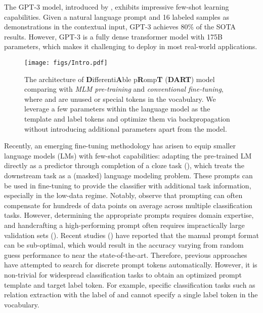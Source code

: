 \documentclass{article} \usepackage{iclr2022_conference,times}
\begin{document}
The GPT-3 model, introduced by \cite{DBLP:conf/nips/BrownMRSKDNSSAA20}, exhibits impressive few-shot learning capabilities. 
Given a natural language prompt and 16 labeled samples as demonstrations in the contextual input, GPT-3 achieves 80\% of the SOTA results.
However, GPT-3 is a fully dense transformer model with 175B parameters, which makes it challenging to deploy in most real-world applications. 






\begin{figure} 
\centering 
\texttt{[image: figs/Intro.pdf]}  
\caption{The architecture of \textbf{D}ifferenti\textbf{A}ble p\textbf{R}omp\textbf{T} (\textbf{DART}) model comparing with \emph{MLM pre-training} and \emph{conventional fine-tuning}, where  and  are unused or special tokens in the vocabulary.
 {\color{highlight}
We leverage a few parameters within the language model as the template and label tokens and optimize them via backpropagation without introducing additional parameters apart from the model. }
 } 
\label{model}  
\end{figure}


Recently, an emerging fine-tuning methodology has arisen to equip smaller language models (LMs) with few-shot capabilities: adapting the pre-trained LM directly as a predictor through completion of a cloze task (\cite{DBLP:conf/eacl/SchickS21,DBLP:journals/corr/abs-2009-07118,DBLP:journals/corr/abs-2012-15723,DBLP:journals/corr/abs-2103-10385}), which treats the downstream task as a (masked) language modeling problem.
These prompts can be used in fine-tuning to provide the classifier with additional task information, especially in the low-data regime. 
Notably, \cite{DBLP:journals/corr/abs-2103-08493} observe that prompting can often compensate for hundreds of data points on average across multiple classification tasks.
However, determining the appropriate prompts requires domain expertise, and handcrafting a high-performing prompt often requires impractically large validation sets (\cite{Ethan2021true}). 
Recent studies (\cite{DBLP:journals/corr/abs-2104-08786,DBLP:journals/corr/abs-2102-09690}) have reported that the manual prompt format can be sub-optimal, which would result in the accuracy varying from random guess performance to near the state-of-the-art.
Therefore, previous approaches have attempted to search for discrete prompt tokens automatically. 
However, it is non-trivial for widespread classification tasks to obtain an optimized prompt template and target label token.
For example, specific classification tasks such as relation extraction with the label of  and  cannot specify a single label token in the vocabulary. 
\end{document}
